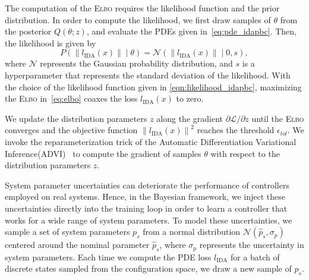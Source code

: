 %
The computation of the \textsc{Elbo} requires the likelihood function and
the prior distribution.
%
In order to compute the likelihood, we first draw samples of $\theta$ from the
posterior $Q(\theta;z)$, and evaluate the PDEs given in~\eqref{eq:pde_idapbc}.
Then, the likelihood is given by
\begin{equation}
    P( \left\| l_{\textrm{IDA}} (x) \right\| \mid \theta) = \mathcal{N}\left(\left\| l_{\textrm{IDA}} (x) \right\| \; | \; 0, s \right),
    \label{eqn:likelihood_idapbc}
\end{equation}
where $\mathcal{N}$ represents the Gaussian probability distribution, and $s$ is
a hyperparameter that represents the standard deviation of the likelihood.
%
With the choice of the likelihood function given in
\eqref{eqn:likelihood_idapbc}, maximizing the \textsc{Elbo}
in~\eqref{eq:elbo} coaxes the loss $l_{\text{IDA}}(x)$ to zero.


%
We update the distribution parameters $z$ along the gradient $\partial
\mathcal{L}/\partial z$ until the \textsc{Elbo} converges and the objective
function $\left\| l_{\textrm{IDA}} (x) \right\|^2$ reaches the threshold
$\epsilon_{tol}$.
%
We invoke the reparameterization trick of the Automatic Differentiation
Variational Inference(\textsc{ADVI})~\cite{kucukelbir2015automatic} to compute
the gradient of samples $\theta$ with respect to the distribution parameters
$z$.


System parameter uncertainties can deteriorate the performance of controllers
employed on real systems. 
%
Hence, in the Bayesian framework, we inject these uncertainties directly into
the training loop in order to learn a controller that works for a wide range of
system parameters.
%
To model these uncertainties, we sample a set of system parameters $p_s$ from
a normal distribution $\mathcal{N}(\hat{p}_s, \sigma_{p})$ centered around the
nominal parameter $\hat{p}_s$, where $\sigma_{p}$ represents the uncertainty
in system parameters.
%
Each time we compute the PDE loss $l_{\text{IDA}}$ for a batch of discrete
states sampled from the configuration space, we draw a new sample
of $p_s$.
